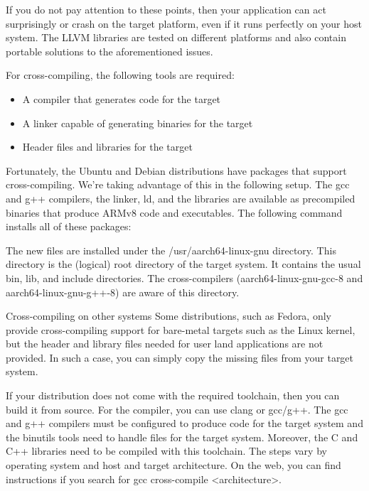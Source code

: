 If you do not pay attention to these points, then your application can act surprisingly or crash on the target platform, even if it runs perfectly on your host system. The LLVM libraries are tested on different platforms and also contain portable solutions to the aforementioned issues.

For cross-compiling, the following tools are required:

\begin{itemize}
\item
A compiler that generates code for the target

\item
A linker capable of generating binaries for the target

\item
Header files and libraries for the target
\end{itemize}

Fortunately, the Ubuntu and Debian distributions have packages that support cross-compiling. We’re taking advantage of this in the following setup. The gcc and g++ compilers, the linker, ld, and the libraries are available as precompiled binaries that produce ARMv8 code and executables. The following command installs all of these packages:


The new files are installed under the /usr/aarch64-linux-gnu directory. This directory is the (logical) root directory of the target system. It contains the usual bin, lib, and include directories. The cross-compilers (aarch64-linux-gnu-gcc-8 and aarch64-linux-gnu-g++-8) are aware of this directory.

\begin{myTip}{Cross-compiling on other systems}
Some distributions, such as Fedora, only provide cross-compiling support for bare-metal targets such as the Linux kernel, but the header and library files needed for user land applications are not provided. In such a case, you can simply copy the missing files from your target system.

If your distribution does not come with the required toolchain, then you can build it from source. For the compiler, you can use clang or gcc/g++. The gcc and g++ compilers must be configured to produce code for the target system and the binutils tools need to handle files for the target system. Moreover, the C and C++ libraries need to be compiled with this toolchain. The steps vary by operating system and host and target architecture. On the web, you can find instructions if you search for gcc cross-compile <architecture>.
\end{myTip}

